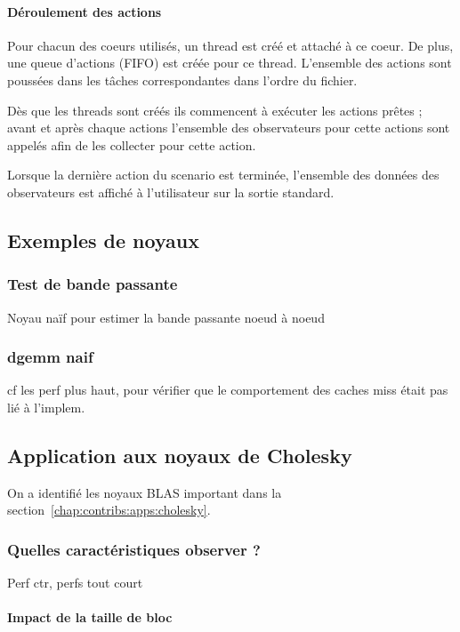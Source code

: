 \paragraph{Déroulement des actions}
Pour chacun des coeurs utilisés, un thread est créé et attaché à ce coeur. De plus, une queue d'actions (FIFO) est créée pour ce thread.
L'ensemble des actions sont poussées dans les tâches correspondantes dans l'ordre du fichier.

Dès que les threads sont créés ils commencent à exécuter les actions prêtes ; avant et après chaque actions l'ensemble des observateurs pour cette actions sont appelés afin de les collecter pour cette action.

Lorsque la dernière action du scenario est terminée, l'ensemble des données des observateurs est affiché à l'utilisateur sur la sortie standard.

\subsection{Exemples de noyaux}

\subsubsection{Test de bande passante}

Noyau naïf pour estimer la bande passante noeud à noeud

\subsubsection{dgemm naif}

cf les perf plus haut, pour vérifier que le comportement des caches miss était pas lié à l'implem.


\subsection{Application aux noyaux de Cholesky}

On a identifié les noyaux BLAS important dans la section~\ref{chap:contribs:apps:cholesky}.

\subsubsection{Quelles caractéristiques observer ?}
Perf ctr, perfs tout court

\paragraph{Impact de la taille de bloc}


